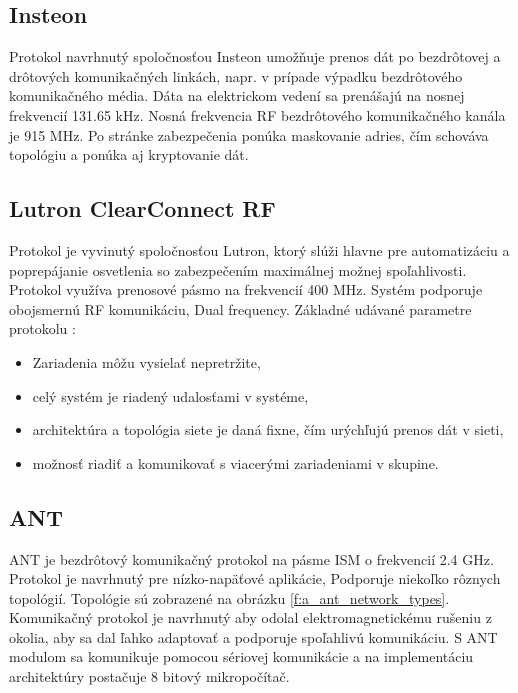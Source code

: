\documentclass[12pt,a4paper,oneside,openright]{report}
\begin{document}
\subsection{Insteon}
Protokol navrhnutý spoločnosťou Insteon umožňuje prenos dát po bezdrôtovej a drôtových komunikačných linkách, napr. v prípade výpadku bezdrôtového komunikačného média.
Dáta na elektrickom vedení sa prenášajú na nosnej frekvencií 131.65 kHz. Nosná frekvencia RF bezdrôtového komunikačného kanála je 915 MHz.
Po stránke zabezpečenia ponúka maskovanie adries, čím schováva topológiu a ponúka aj kryptovanie dát. \cite{insteon}

\subsection{Lutron ClearConnect RF}
Protokol je vyvinutý spoločnosťou Lutron, ktorý slúži hlavne pre automatizáciu a poprepájanie osvetlenia so zabezpečením maximálnej možnej spoľahlivosti. Protokol využíva prenosové pásmo na frekvencií 400 MHz. Systém podporuje obojsmernú RF komunikáciu, Dual frequency. Základné udávané parametre protokolu \cite{lutron}:
\begin{itemize}
	\item Zariadenia môžu vysielať nepretržite,
	\item celý systém je riadený udalosťami v systéme,
	\item architektúra a topológia siete je daná fixne, čím urýchľujú prenos dát v sieti,
	\item možnosť riadiť a komunikovať s viacerými zariadeniami v skupine.
\end{itemize}
\onehalfspacing

\subsection{ANT}
ANT je bezdrôtový komunikačný protokol na pásme ISM o frekvencií 2.4 GHz. Protokol je navrhnutý pre nízko-napäťové aplikácie, Podporuje niekoľko rôznych topológií. Topológie sú zobrazené na obrázku \ref{f:a_ant_network_types}. Komunikačný protokol je navrhnutý aby odolal elektromagnetickému rušeniu z okolia, aby sa dal ľahko adaptovať a podporuje spoľahlivú komunikáciu.
S ANT modulom sa komunikuje pomocou sériovej komunikácie a na implementáciu architektúry postačuje 8 bitový mikropočítač.
\end{document}
